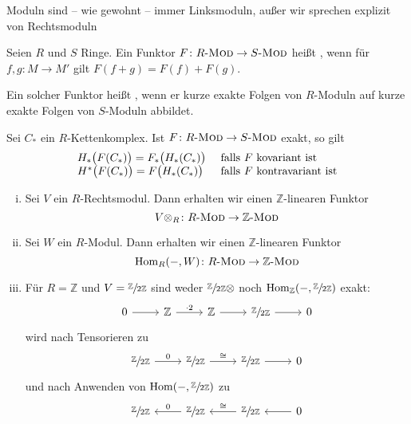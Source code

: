 \begin{konvention}[{name=[Links- und Rechtsmoduln]}]
	Moduln sind -- wie gewohnt -- immer Linksmoduln, außer wir sprechen explizit von Rechtsmoduln
\end{konvention}

\begin{definition}[{name=[{lineare und exakte Funktoren}]}]
	Seien $R$ und $S$ Ringe.
	Ein Funktor $F\colon \Mod{R} \to \Mod{S}$ heißt , wenn für $f,g \colon M \to M'$ gilt $F(f + g)= F(f) + F(g)$.
	
	Ein solcher Funktor heißt , wenn er kurze exakte Folgen von $R$-Moduln auf kurze exakte Folgen von $S$-Moduln abbildet.
\end{definition}

\begin{bemerkung}[{name=[exakte Funktoren und (Ko-)Homologie]}]
	Sei $C_*$ ein $R$-Kettenkomplex.
	Ist $F \colon \Mod{R} \to \Mod{S}$ exakt, so gilt
	\[
		\begin{array}{ll}
			H_* \enbrace[\big]{F(C_*)} = F_* \enbrace[\big]{H_*(C_*)} & \text{ falls $F$ kovariant ist} \\
			H^* \enbrace[\big]{F(C_*)} = F \enbrace[\big]{H_*(C_*)} & \text{ falls $F$ kontravariant ist} 
		\end{array}
	\]
\end{bemerkung}

\begin{beispiel}
	\begin{enumerate}[(i)]
		\item Sei $V$ ein $R$-Rechtsmodul.
		Dann erhalten wir einen $\mathbb{Z}$-linearen Funktor 
		\[
			V \otimes_R \colon \Mod{R} \to \Mod{\mathbb{Z}}
		\]
		\item Sei $W$ ein $R$-Modul. 
		Dann erhalten wir einen $\mathbb{Z}$-linearen Funktor 
		\[
			\Hom_R(-,W) \colon \Mod{R} \to \Mod{\mathbb{Z}}
		\]
		\item Für $R=\mathbb{Z}$ und $V= \sfrac{\mathbb{Z}}{2 \mathbb{Z}}$ sind weder $\sfrac{\mathbb{Z}}{2 \mathbb{Z}} \otimes $ noch $\Hom_\mathbb{Z} \enbrace*{-, \sfrac{\mathbb{Z}}{2 \mathbb{Z}}}$ exakt:
		\[
			\begin{tikzcd}
				0 \rar & \mathbb{Z} \rar["\cdot 2"] & \mathbb{Z} \rar & \sfrac{\mathbb{Z}}{2 \mathbb{Z}} \rar & 0
			\end{tikzcd}
		\]
		wird nach Tensorieren zu 
		\[
			\begin{tikzcd}
				\sfrac{\mathbb{Z}}{2 \mathbb{Z}} \rar["0"] & \sfrac{\mathbb{Z}}{2 \mathbb{Z}} \rar["\cong"] & \sfrac{\mathbb{Z}}{2 \mathbb{Z}} \rar & 0
			\end{tikzcd}
		\]
		und nach Anwenden von $\Hom(-,\sfrac{\mathbb{Z}}{2 \mathbb{Z}})$ zu
		\[
			\begin{tikzcd}
				\sfrac{\mathbb{Z}}{2 \mathbb{Z}}  & \sfrac{\mathbb{Z}}{2 \mathbb{Z}} \lar["0"']  & \sfrac{\mathbb{Z}}{2 \mathbb{Z}}\lar["\cong"']  & 0 \lar
			\end{tikzcd}
		\]
	\end{enumerate}
\end{beispiel}

